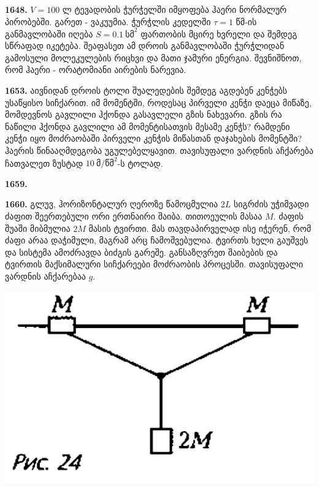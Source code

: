 \documentclass[12pt,a4paper,]{report}
\begin{document}
\textbf{1648.} $V=100$ ლ ტევადობის ჭურჭელში იმყოფება ჰაერი ნორმალურ პირობებში. გარეთ - ვაკუუმია. ჭურჭლის კედელში $\tau=1$ წმ-ის განმავლობაში იღება $S=0.1\ \text{სმ}^2$ ფართობის მცირე ხვრელი და შემდეგ სწრაფად იკეტება. შეაფასეთ ამ დროის განმავლობაში ჭურჭლიდან გამოსული მოლეკულების რიცხვი და მათი ჯამური ენერგია. შევნიშნოთ, რომ ჰაერი - ორატომიანი აირების ნარევია.

\textbf{1653.} აივნიდან დროის ტოლი შუალედების შემდეგ აგდებენ კენჭებს უსაწყისო სიჩქარით. იმ მომენტში, როდესაც პირველი კენჭი დაეცა მიწაზე, მომდევნოს გავლილი ჰქონდა გასავლელი გზის ნახევარი. გზის რა ნაწილი ჰქონდა გავლილი ამ მომენტისათვის მესამე კენჭს? რამდენი კენჭი იყო მოძრაობაში პირველი კენჭის მიწასთან დაჯახების მომენტში? ჰაერის წინააღმდეგობა უგულებელყავით. თავისუფალი ვარდნის აჩქარება ჩათვალეთ ზუსტად $10\ \text{მ}/\text{წმ}^2$-ს ტოლად.

\textbf{1659.} 

\textbf{1660.} გლუვ, ჰორიზონტალურ ღეროზე წამოცმულია $2L$ სიგრძის უჭიმვადი ძაფით შეერთებული ორი ერთნაირი შაიბა. თითოეულის მასაა $M$. ძაფის შუაში მიბმულია $2M$ მასის ტვირთი. მას თავდაპირველად ისე იჭერენ, რომ ძაფი არაა დაჭიმული, მაგრამ არც ჩამოშვებულია. ტვირთს ხელი გაუშვეს და სისტემა ამოძრავდა ბიძგის გარეშე. განსაზღვრეთ შაიბების და ტვირთის მაქსიმალური სიჩქარეები მოძრაობის პროცესში. თავისუფალი ვარდნის აჩქარებაა $g$. 
		\begin{center}
			\includegraphics[scale=0.3]{images/1660.png}
		\end{center}
\end{document}
